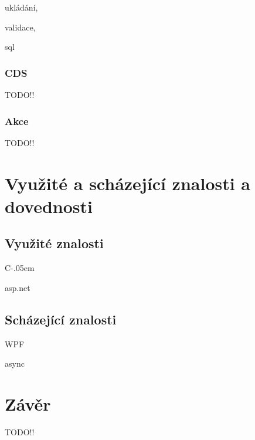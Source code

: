 \documentclass[czech,bachelor,dept460,male,csharp]{diploma}
\newcommand{\Csharp}{%
  {\settoheight{\dimen0}{C}C\kern-.05em \resizebox{!}{\dimen0}{\raisebox{\depth}{\#}}}}
\begin{document}
			ukládání,
			
			validace, 
			
			sql		
		\subsubsection{CDS}
			TODO!!
			
		\subsubsection{Akce}
			TODO!!
			
\section{Využité a scházející znalosti a dovednosti}
	\subsection{Využité znalosti}
		\Csharp
		
		asp.net
	\subsection{Scházející znalosti}
		WPF 
		
		async
		
\section{Závěr}
TODO!!


\printbibliography[title={Literatura}, heading=bibintoc]


\end{document}
